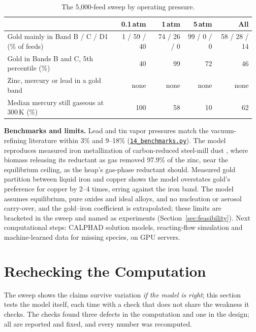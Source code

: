 \documentclass[11pt,a4paper]{article}
\newcommand{\gh}[2]{\href{https://github.com/syncaissa/paramanu-reclaimer/blob/main/#1}{\texttt{#2}}}
\theoremstyle{definition}
\theoremstyle{plain}
\theoremstyle{remark}
\begin{document}
\begin{table}[!htbp]
\centering
\caption{The 5,000-feed sweep by operating pressure.}\label{tab:sweep}
\footnotesize
\begin{tabular}{@{}p{6.2cm}rrrr@{}}
\toprule
& \textbf{0.1\,atm} & \textbf{1\,atm} & \textbf{5\,atm} & \textbf{All} \\
\midrule
Gold mainly in Band B / C / D1 (\% of feeds) & 1 / 59 / 40 & 74 / 26 / 0 & 99 / 0 / 0 & 58 / 28 / 14 \\
Gold in Bands B and C, 5th percentile (\%) & 40 & 99 & 72 & 46 \\
Zinc, mercury or lead in a gold band & none & none & none & none \\
Median mercury still gaseous at 300\,K (\%) & 100 & 58 & 10 & 62 \\
\bottomrule
\end{tabular}
\end{table}

\textbf{Benchmarks and limits.} Lead and tin vapor pressures match the vacuum-refining literature within 3\% and 9--18\% \citep{jia2013} (\gh{simulation/scripts/14_benchmarks.py}{14\_benchmarks.py}). The model reproduces measured iron metallization of carbon-reduced steel-mill dust \citep{chang2022}, where biomass releasing its reductant as gas removed 97.9\% of the zinc, near the equilibrium ceiling, as the heap's gas-phase reductant should. Measured gold partition between liquid iron and copper \citep{yamaguchi2006} shows the model overstates gold's preference for copper by 2--4 times, erring against the iron band. The model assumes equilibrium, pure oxides and ideal alloys, and no nucleation or aerosol carry-over, and the gold--iron coefficient is extrapolated; these limits are bracketed in the sweep and named as experiments (Section~\ref{sec:feasibility}). Next computational steps: CALPHAD solution models, reacting-flow simulation and machine-learned data for missing species, on GPU servers.

\section{Rechecking the Computation}\label{sec:verification}

The sweep shows the claims survive variation \emph{if the model is right}; this section tests the model itself, each time with a check that does not share the weakness it checks. The checks found three defects in the computation and one in the design; all are reported and fixed, and every number was recomputed.
\end{document}

